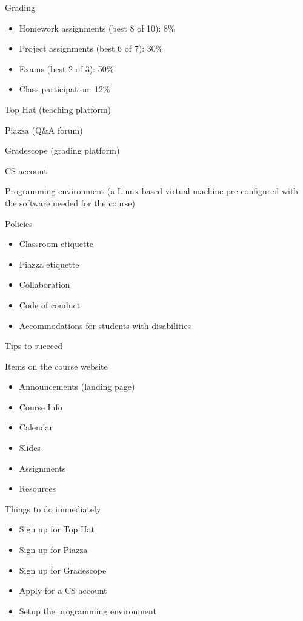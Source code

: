 \documentclass[8pt,a4paper,compress]{beamer}
\begin{document}
\begin{frame}[fragile]
\pause

Grading
\begin{itemize}
\item Homework assignments (best 8 of 10): 8\%
\item Project assignments (best 6 of 7): 30\%
\item Exams (best 2 of 3): 50\%
\item Class participation: 12\%
\end{itemize}

\pause
\bigskip

Top Hat (teaching platform)

\pause
\bigskip

Piazza (Q\&A forum)

\pause
\bigskip

Gradescope (grading platform)

\pause
\bigskip

CS account

\pause
\bigskip

Programming environment (a Linux-based virtual machine pre-configured with the software needed for the course)

\pause
\bigskip

Policies
\begin{itemize}
\item Classroom etiquette
\item Piazza etiquette
\item Collaboration
\item Code of conduct
\item Accommodations for students with disabilities
\end{itemize}
\end{frame}

\begin{frame}[fragile]
\pause

Tips to succeed

\pause
\bigskip

Items on the course website
\begin{itemize}
\item Announcements (landing page)
\item Course Info
\item Calendar
\item Slides 
\item Assignments
\item Resources
\end{itemize}

\pause
\bigskip

Things to do immediately
\begin{itemize}
\item Sign up for Top Hat
\item Sign up for Piazza
\item Sign up for Gradescope
\item Apply for a CS account
\item Setup the programming environment
\end{itemize}
\end{frame}
\end{document}

